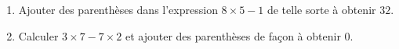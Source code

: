 
\begin{exercice}\label{exosmath-0820}

    \begin{enumerate}
        \item
            Ajouter des parenthèses dans l'expression \( 8\times 5-1\) de telle sorte à obtenir \( 32\).
        \item
            Calculer \( 3\times 7-7\times 2\) et ajouter des parenthèses de façon à obtenir \( 0\).
    \end{enumerate}

\end{exercice}
